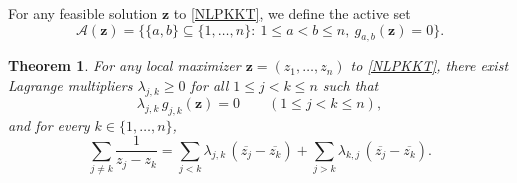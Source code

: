 \documentclass{article}
\newtheorem{thr}{Theorem}
\theoremstyle{definition}
\let\le\leqslant
\let\ge\geqslant
\begin{document}
For any feasible solution \(\mathbf{z}\) to \cref{NLPKKT}, we define the active set 
\[
\mathcal A(\mathbf z)=\bigl\{\{a,b\}\subseteq\{1,\dots,n\}:\ 1\le a<b\le n,\ g_{a,b}(\mathbf z)=0\bigr\}.
\]





\begin{thr}\label{thm:KKTNec}
For any local maximizer \(\mathbf{z}=(z_1,\dots,z_n)\) to \cref{NLPKKT},
there exist Lagrange multipliers \(\lambda_{j,k}\ge 0\) for all \(1\le j<k\le n\)
such that
\[
\lambda_{j,k}\, g_{j,k}(\mathbf z)=0\qquad(1\le j<k\le n),
\]
and for every \(k\in\{1,\dots,n\}\),
\begin{equation}\label{eq:summationth12}
\sum_{j\neq k}\frac{1}{z_j-z_k}
=
\sum_{j<k}\lambda_{j,k}\,(\overline{z_j}-\overline{z_k})
+
\sum_{j>k}\lambda_{k,j}\,(\overline{z_j}-\overline{z_k}).
\end{equation}
\end{thr}
\end{document}
